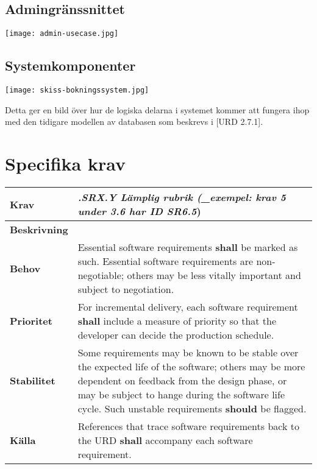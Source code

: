 \documentclass[a4paper, twoside, 11pt, titlepage]{article}
\begin{document}
	\subsection{Admingränssnittet}


	\texttt{[image: admin-usecase.jpg]}

	\subsection{Systemkomponenter}


	\texttt{[image: skiss-bokningssystem.jpg]}

	Detta ger en bild över hur de logiska delarna i systemet kommer att fungera ihop med den tidigare modellen av databasen som beskrevs i [URD 2.7.1].

\clearpage
\section{Specifika krav}


\begin{tabular} { p{2.6cm} p{12.5cm} }
	\hline
	\sffamily\textbf{Krav} & \emph{.SRX.Y Lämplig rubrik (\_exempel: krav 5 under 3.6 har ID SR6.5})  \\
	\hline
	\sffamily\textbf{Beskrivning} &   \\
	\hline
	\sffamily\textbf{Behov} & Essential software requirements \textbf{shall} be marked as such. Essential software requirements are non-negotiable; others may be less vitally important and subject to negotiation.  \\
	\hline
	\sffamily\textbf{Prioritet} & For incremental delivery, each software requirement \textbf{shall} include a measure of priority so that the developer can decide the production schedule.  \\
	\hline
	\sffamily\textbf{Stabilitet} & Some requirements may be known to be stable over the expected life of the software; others may be more dependent on feedback from the design phase, or may be subject to  hange during the software life cycle. Such unstable requirements \textbf{should} be flagged.  \\
	\hline
	\sffamily\textbf{Källa} & References that trace software requirements back to the URD \textbf{shall} accompany each software requirement.  \\
	\hline
\end{tabular}
\vspace{6mm}
\end{document}
